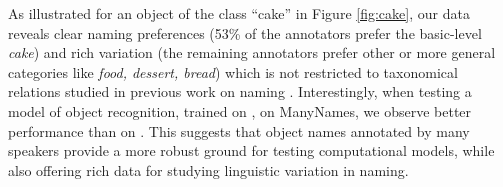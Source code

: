 As illustrated for an object of the class ``cake'' in Figure \ref{fig:cake}, our data reveals clear naming preferences (53\% of the annotators prefer the basic-level \textit{cake}) and rich variation (the remaining annotators prefer other or more general categories like \textit{food, dessert, bread}) which is not restricted to taxonomical relations studied in previous work on naming \cite{rosch1976basic,Ordonez:2016,graf2016animal}. 
Interestingly, when testing a model of object recognition, trained on \vg, on ManyNames, we observe better performance than on \vg.
This suggests that object names annotated by many speakers provide a more robust ground for testing computational models, while also offering rich data for studying linguistic variation in naming.


